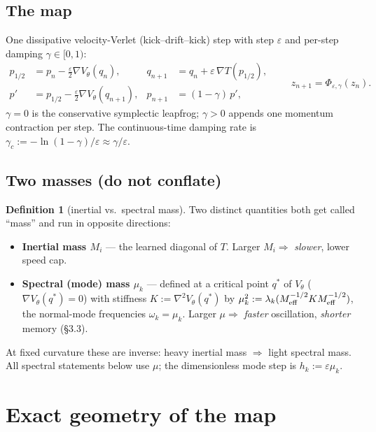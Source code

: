 \documentclass[11pt]{article}
\theoremstyle{plain}
\theoremstyle{definition}
\newtheorem{definition}{Definition}
\begin{document}
\subsection{The map}
One dissipative velocity-Verlet (kick--drift--kick) step with step $\varepsilon$ and per-step damping $\gamma\in[0,1)$:
\begin{equation}
\begin{aligned}
p_{1/2} &= p_n - \tfrac{\varepsilon}{2}\nabla V_\theta(q_n), &
q_{n+1} &= q_n + \varepsilon\,\nabla T(p_{1/2}),\\
p' &= p_{1/2} - \tfrac{\varepsilon}{2}\nabla V_\theta(q_{n+1}), &
p_{n+1} &= (1-\gamma)\,p',
\end{aligned}
\qquad z_{n+1}=\Phi_{\varepsilon,\gamma}(z_n).
\end{equation}
$\gamma=0$ is the conservative symplectic leapfrog; $\gamma>0$ appends one momentum contraction per step. The continuous-time damping rate is $\gamma_c:=-\ln(1-\gamma)/\varepsilon\approx\gamma/\varepsilon$.

\subsection{Two masses (do not conflate)}
\begin{definition}[inertial vs.\ spectral mass]
Two distinct quantities both get called ``mass'' and run in opposite directions:
\begin{itemize}
\item \textbf{Inertial mass $M_i$} --- the learned diagonal of $T$. Larger $M_i\Rightarrow$ \emph{slower}, lower speed cap.
\item \textbf{Spectral (mode) mass $\mu_k$} --- defined at a critical point $q^\ast$ of $V_\theta$ ($\nabla V_\theta(q^\ast)=0$) with stiffness $K:=\nabla^2V_\theta(q^\ast)$ by $\mu_k^2:=\lambda_k(M_{\rm eff}^{-1/2}KM_{\rm eff}^{-1/2})$, the normal-mode frequencies $\omega_k=\mu_k$. Larger $\mu\Rightarrow$ \emph{faster} oscillation, \emph{shorter} memory (\S3.3).
\end{itemize}
\end{definition}
At fixed curvature these are inverse: heavy inertial mass $\Rightarrow$ light spectral mass. All spectral statements below use $\mu$; the dimensionless mode step is $h_k:=\varepsilon\mu_k$.

\section{Exact geometry of the map}
\end{document}
